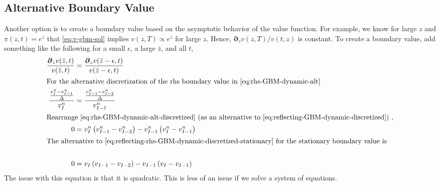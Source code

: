 \documentclass[11pt]{article}
\newcommand{\D}[1][]{\ensuremath{\boldsymbol{\partial}_{#1}}}
\begin{document}
\subsection{Alternative Boundary Value}

	Another option is to create a boundary value based on the asymptotic behavior of the value function.  For example, we know for large $z$ and $\pi(z,t) = e^z$ that \cref{eq:v-gbm-sol}  implies $v(z,T) \propto e^z$ for large $z$.  Hence, $\D[z]v(z,T)/v(t,z)$ is constant.  To create a boundary value, add something like the following for a small $\epsilon$, a large $\bar{z}$, and all $t$,
	\begin{align}
		\frac{\D[z]v(\bar{z},t)}{v(\bar{z},t)} &= \frac{\D[z]v(\bar{z}- \epsilon,t)}{v(\bar{z}- \epsilon ,t)}\label{eq:rhs-GBM-dynamic-alt}\\
		\intertext{For the alternative discretization of the rhs boundary value in \cref{eq:rhs-GBM-dynamic-alt}}
		\frac{\frac{v^n_I - v^n_{I-1}}{\Delta}}{v^n_I} &= \frac{\frac{v^n_{I-1} - v^n_{I-2}}{\Delta}}{v^n_{I-1}}\label{eq:rhs-GBM-dynamic-alt-discretized}	\\
		\intertext{Rearrange \cref{eq:rhs-GBM-dynamic-alt-discretized} (as an alternative to \cref{eq:reflecting-GBM-dynamic-discretized}) ,}
		0&= v^n_I\left(v^n_{I-1} - v^n_{I-2}\right)-v^n_{I-1}\left(v^n_I - v^n_{I-1}\right)\label{eq:alt-rhs-GBM-dynamic-discretized}\\
		\intertext{The alternative to \cref{eq:reflecting-rhs-GBM-dynamic-discretized-stationary} for the stationary boundary value is}\\
		0&= v_I\left(v_{I-1} - v_{I-2}\right)-v_{I-1}\left(v_I - v_{I-1}\right)\label{eq:alternative-rhs-GBM-dynamic-discretized-stationary}
	\end{align}
	The issue with this equation is that it is quadratic.  This is less of an issue if we solve a system of equations.
\end{document}
